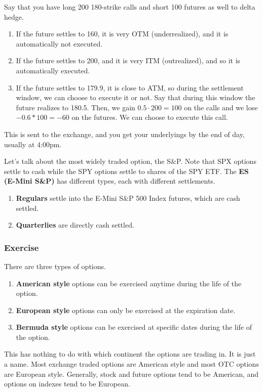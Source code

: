 \documentclass{article}
\begin{document}
      \begin{example}
        \label{ex:contrary-exercise}
        Say that you have long 200 180-strike calls and short 100 futures as well to delta hedge. 
        \begin{enumerate}
          \item If the future settles to 160, it is very OTM (underrealized), and it is automatically not executed. 
          \item If the future settles to 200, and it is very ITM (outrealized), and so it is automatically executed. 
          \item If the future settles to 179.9, it is close to ATM, so during the settlement window, we can choose to execute it or not. Say that during this window the future realizes to 180.5. Then, we gain $0.5 \cdot 200 = 100$ on the calls and we lose $-0.6 * 100 = -60$ on the futures. We can choose to execute this call. 
        \end{enumerate}
        This is sent to the exchange, and you get your underlyings by the end of day, usually at 4:00pm. 
      \end{example}

      \begin{example}[ES Options]
        \label{ex:es-options}
        Let's talk about the most widely traded option, the S\&P. Note that SPX options settle to cash while the SPY options settle to shares of the SPY ETF. The \textbf{ES (E-Mini S\&P)} has different types, each with different settlements. 
        \begin{enumerate}
          \item \textbf{Regulars} settle into the E-Mini S\&P 500 Index futures, which are cash settled. 
          \item \textbf{Quarterlies} are directly cash settled.  
        \end{enumerate}
      \end{example}

    \subsubsection{Exercise}

      There are three types of options. 
      \begin{enumerate}
        \item \textbf{American style} options can be exercised anytime during the life of the option. 
        \item \textbf{European style} options can only be exercised at the expiration date.
        \item \textbf{Bermuda style} options can be exercised at specific dates during the life of the option.
      \end{enumerate}
      This has nothing to do with which continent the options are trading in. It is just a name. Most exchange traded options are American style and most OTC options are European style. Generally, stock and future options tend to be American, and options on indexes tend to be European. 
\end{document}
